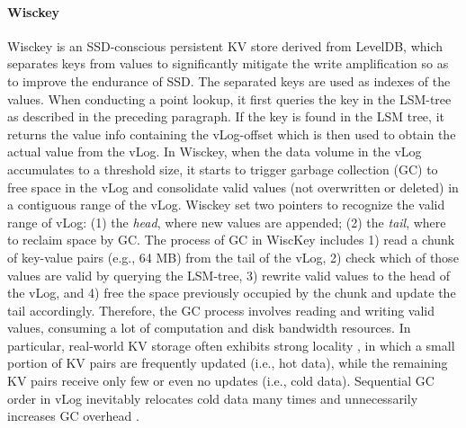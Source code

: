 \documentclass[sigconf]{acmart}
\begin{document}
\paragraph{Wisckey} Wisckey is an SSD-conscious persistent KV store derived from LevelDB, which separates keys from values to significantly mitigate the write amplification so as to improve the endurance of SSD. The separated keys are used as indexes of the values. {} When conducting a point lookup, it first queries the key in the LSM-tree as described in the preceding paragraph. If the key is found in the LSM tree, it returns the value info containing the vLog-offset which is then used to obtain the actual value from the vLog. In Wisckey, when the data volume in the vLog accumulates to a threshold size, it starts to trigger garbage collection (GC) to free space in the vLog and consolidate valid values (not overwritten or deleted) in a contiguous range of the vLog. Wisckey set two pointers to recognize the valid range of vLog: (1) the \textit{head}, where new values are appended; (2) the \textit{tail}, where to reclaim space by GC. The process of GC in WiscKey includes 1) read a chunk of key-value pairs (e.g., 64 MB) from the tail of the vLog, 2) check which of those values are valid by querying the LSM-tree, 3) rewrite valid values to the head of the vLog, and 4) free the space previously occupied by the chunk and update the tail accordingly. Therefore, the GC process involves reading and writing valid values, consuming a lot of computation and disk bandwidth resources.  In particular, real-world KV storage often exhibits strong locality \cite{Workload}, in which a small portion of KV pairs are frequently updated (i.e., hot data), while the remaining KV pairs receive only few or even no updates (i.e., cold data). Sequential GC order in vLog inevitably relocates cold data many times and unnecessarily increases GC overhead \cite{HashKV}.
\end{document}
